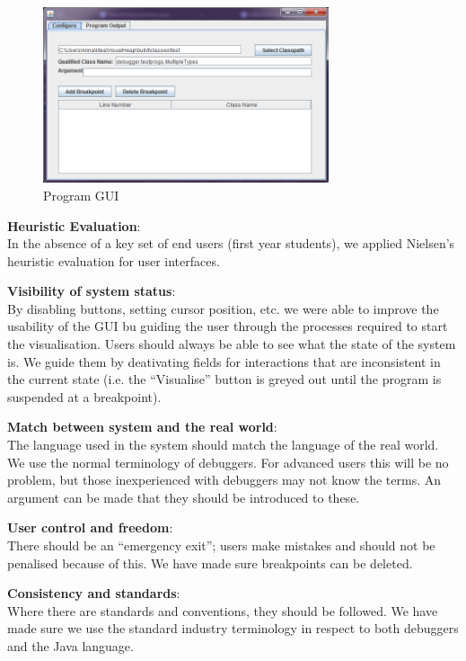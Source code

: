 \documentclass[11pt, a4paper]{report}
\begin{document}
\begin{figure}[h]
        \centering
        \includegraphics[width=0.75\textwidth]{images/final/gui.png}
        \caption{Program GUI}
\end{figure}

{\bfseries Heuristic Evaluation}: \\
In the absence of a key set of end users (first year students), we applied Nielsen’s heuristic evaluation for user interfaces.

{\bfseries Visibility of system status}: \\
By disabling buttons, setting cursor position, etc. we were able to improve the usability of the GUI bu guiding the user through the processes required to start the visualisation. Users should always be able to see what the state of the system is. We guide them by deativating fields for interactions that are inconsistent in the current state (i.e. the “Visualise” button is greyed out until the program is suspended at a breakpoint).

{\bfseries Match between system and the real world}: \\
The language used in the system should match the language of the real world. We use the normal terminology of debuggers. For advanced users this will be no problem, but those inexperienced with debuggers may not know the terms. An argument can be made that they should be introduced to these.

{\bfseries User control and freedom}: \\
There should be an “emergency exit”; users make mistakes and should not be penalised because of this. We have made sure breakpoints can be deleted.

{\bfseries Consistency and standards}: \\
Where there are standards and conventions, they should be followed. We have made sure we use the standard industry terminology in respect to both debuggers and the Java language.
\end{document}
